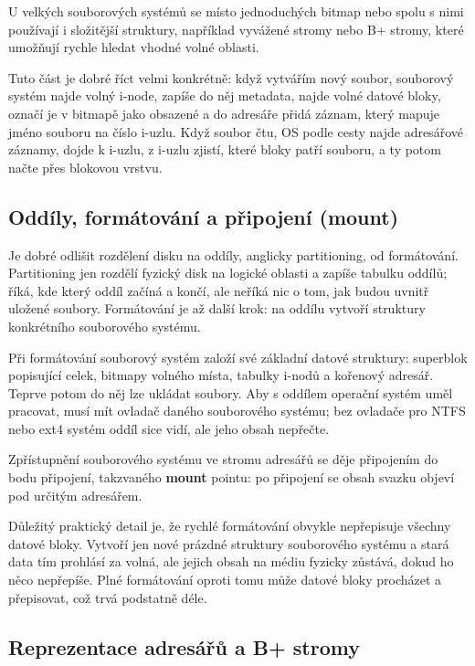 \documentclass[11pt,a4paper]{article}
\begin{document}
U velkých souborových systémů se místo jednoduchých bitmap nebo spolu s nimi používají i složitější struktury, například vyvážené stromy nebo B+ stromy, které umožňují rychle hledat vhodné volné oblasti.

Tuto část je dobré říct velmi konkrétně: když vytvářím nový soubor, souborový systém najde volný i-node, zapíše do něj metadata, najde volné datové bloky, označí je v bitmapě jako obsazené a do adresáře přidá záznam, který mapuje jméno souboru na číslo i-uzlu. Když soubor čtu, OS podle cesty najde adresářové záznamy, dojde k i-uzlu, z i-uzlu zjistí, které bloky patří souboru, a ty potom načte přes blokovou vrstvu.

\subsection*{Oddíly, formátování a připojení (mount)}

Je dobré odlišit rozdělení disku na oddíly, anglicky partitioning, od formátování. Partitioning jen rozdělí fyzický disk na logické oblasti a zapíše tabulku oddílů; říká, kde který oddíl začíná a končí, ale neříká nic o tom, jak budou uvnitř uložené soubory. Formátování je až další krok: na oddílu vytvoří struktury konkrétního souborového systému.

Při formátování souborový systém založí své základní datové struktury: superblok popisující celek, bitmapy volného místa, tabulky i-nodů a kořenový adresář. Teprve potom do něj lze ukládat soubory. Aby s oddílem operační systém uměl pracovat, musí mít ovladač daného souborového systému; bez ovladače pro NTFS nebo ext4 systém oddíl sice vidí, ale jeho obsah nepřečte.

Zpřístupnění souborového systému ve stromu adresářů se děje připojením do bodu připojení, takzvaného \textbf{mount} pointu: po připojení se obsah svazku objeví pod určitým adresářem.

Důležitý praktický detail je, že rychlé formátování obvykle nepřepisuje všechny datové bloky. Vytvoří jen nové prázdné struktury souborového systému a stará data tím prohlásí za volná, ale jejich obsah na médiu fyzicky zůstává, dokud ho něco nepřepíše. Plné formátování oproti tomu může datové bloky procházet a přepisovat, což trvá podstatně déle.

\subsection*{Reprezentace adresářů a B+ stromy}
\end{document}
